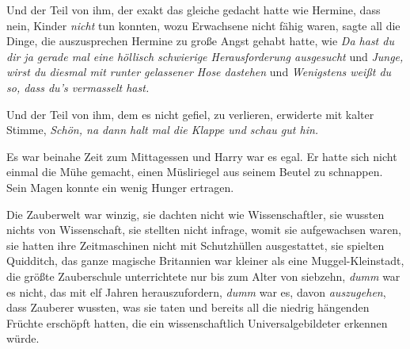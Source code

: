 Und der Teil von ihm, der exakt das gleiche gedacht hatte wie Hermine, dass nein, Kinder \emph{nicht} tun konnten, wozu Erwachsene nicht fähig waren, sagte all die Dinge, die auszusprechen Hermine zu große Angst gehabt hatte, wie \emph{Da hast du dir ja gerade mal eine höllisch schwierige Herausforderung ausgesucht} und \emph{Junge, wirst du diesmal mit runter gelassener Hose dastehen} und \emph{Wenigstens weißt du so, dass du's vermasselt hast.}

Und der Teil von ihm, dem es nicht gefiel, zu verlieren, erwiderte mit kalter Stimme, \emph{Schön, na dann halt mal die Klappe und schau gut hin.}

\later

Es war beinahe Zeit zum Mittagessen und Harry war es egal. Er hatte sich nicht einmal die Mühe gemacht, einen Müsliriegel aus seinem Beutel zu schnappen. Sein Magen konnte ein wenig Hunger ertragen.

Die Zauberwelt war winzig, sie dachten nicht wie Wissenschaftler, sie wussten nichts von Wissenschaft, sie stellten nicht infrage, womit sie aufgewachsen waren, sie hatten ihre Zeitmaschinen nicht mit Schutzhüllen ausgestattet, sie spielten Quidditch, das ganze magische Britannien war kleiner als eine Muggel-Kleinstadt, die größte Zauberschule unterrichtete nur bis zum Alter von siebzehn, \emph{dumm} war es nicht, das mit elf Jahren herauszufordern, \emph{dumm} war es, davon \emph{auszugehen}, dass Zauberer wussten, was sie taten und bereits all die niedrig hängenden Früchte erschöpft hatten, die ein wissenschaftlich Universalgebildeter erkennen würde.

